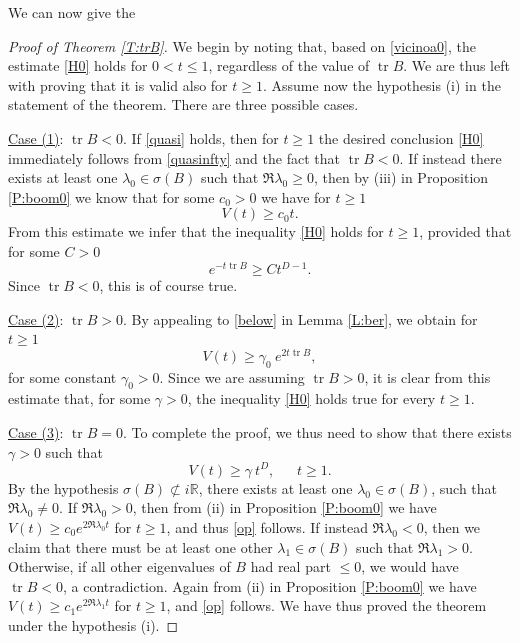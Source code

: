 \documentclass[11pt,letter]{amsart}
\def \R {\mathbb{R}}
\newcommand{\la}{\lambda}
\numberwithin{equation}{section}
\newcommand{\tr}{\operatorname{tr}}
\numberwithin{equation}{section}
\begin{document}






We can now give the  

\vskip 0.2in

\begin{proof}[Proof of Theorem \ref{T:trB}]

We begin by noting that, based on \eqref{vicinoa0}, the estimate \eqref{H0} holds for $0<t\le 1$, regardless of the value of $\tr B$. We are thus left with proving that it is valid also for $t\ge 1$.
Assume now the hypothesis (i) in the statement of the theorem. There are three possible cases.

\medskip

\noindent \underline{Case (1)}: $\tr B<0$. If \eqref{quasi} holds, then for $t\ge 1$ the desired conclusion \eqref{H0} immediately follows  from \eqref{quasinfty} and the fact that $\tr B<0$. If instead there exists at least one $\la_0\in \sigma(B)$ such that $\Re \la_0\ge 0$, then by (iii) in Proposition \ref{P:boom0} we know that for some $c_0>0$ we have for $t\ge 1$
\[
V(t) \ge c_0 t.
\]
From this estimate we infer that the inequality \eqref{H0} holds for $t\ge 1$, provided that for some $C>0$
\[
e^{-t \tr B} \ge C t^{D-1}.
\]
Since $\tr B<0$, this is of course true.

\medskip

\noindent \underline{Case (2)}: $\tr B>0$. By appealing to \eqref{below} in Lemma \ref{L:ber}, we obtain for $t\ge 1$ 
\[
V(t) \ge \gamma_0\ e^{2 t \tr B},
\]
for some constant $\gamma_0>0$. Since we are assuming $\tr B>0$, it is clear from this estimate that, for some $\gamma>0$, the inequality \eqref{H0} holds true for every $t\ge 1$.

\medskip

\noindent \underline{Case (3)}: $\tr B = 0$. To complete the proof, we thus need to show that there exists $\gamma >0$ such that
\begin{equation}\label{op}
V(t) \ge \gamma\ t^D,\ \ \ \ \ \ \ t\ge 1.
\end{equation}
By the hypothesis $\sigma(B)\not\subset i \R$, there exists at least one $\la _0\in \sigma(B)$, such that $\Re \la_0 \not=0$. If $\Re \la_0>0$, then from (ii) in Proposition \ref{P:boom0} we have $V(t) \ge c_0 e^{2 \Re \la_0 t}$ for $t\ge 1$, and thus \eqref{op} follows. If instead $\Re \la_0<0$, then we claim that there must be at least one other $\la_1\in \sigma(B)$ such that $\Re \la_1>0$. Otherwise, if all other eigenvalues of $B$ had real part $\le 0$, we would have $\tr B < 0$, a contradiction. Again from (ii) in Proposition \ref{P:boom0} we have $V(t) \ge c_1 e^{2 \Re \la_1 t}$ for $t\ge 1$, and \eqref{op} follows. We have thus proved the theorem under the hypothesis (i).


\end{proof}
\end{document}
